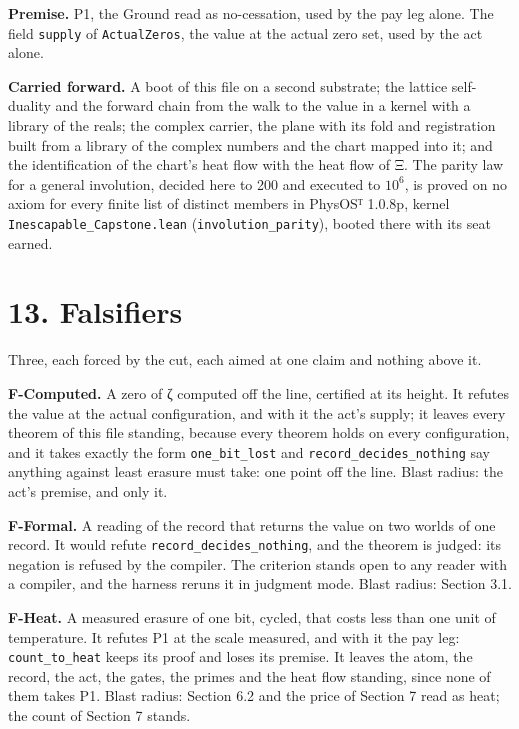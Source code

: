 \documentclass[10pt,twocolumn]{article}
\begin{document}
\textbf{Premise.} P1, the Ground read as no-cessation, used by the pay
leg alone. The field \texttt{supply} of \texttt{ActualZeros}, the value
at the actual zero set, used by the act alone.

\textbf{Carried forward.} A boot of this file on a second substrate; the
lattice self-duality and the forward chain from the walk to the value in
a kernel with a library of the reals; the complex carrier, the plane
with its fold and registration built from a library of the complex
numbers and the chart mapped into it; and the identification of the
chart's heat flow with the heat flow of Ξ. The parity law for a general
involution, decided here to 200 and executed to \(10^6\), is proved on
no axiom for every finite list of distinct members in PhysOSᵀ 1.0.8p,
kernel \texttt{Inescapable\_\allowbreak{}Capstone.lean}
(\texttt{involution\_\allowbreak{}parity}), booted there with its seat earned.

\hypertarget{falsifiers}{%
\section{13. Falsifiers}\label{falsifiers}}

Three, each forced by the cut, each aimed at one claim and nothing above
it.

\textbf{F-Computed.} A zero of ζ computed off the line, certified at its
height. It refutes the value at the actual configuration, and with it
the act's supply; it leaves every theorem of this file standing, because
every theorem holds on every configuration, and it takes exactly the
form \texttt{one\_\allowbreak{}bit\_\allowbreak{}lost} and \texttt{record\_\allowbreak{}decides\_\allowbreak{}nothing} say
anything against least erasure must take: one point off the line. Blast
radius: the act's premise, and only it.

\textbf{F-Formal.} A reading of the record that returns the value on two
worlds of one record. It would refute \texttt{record\_\allowbreak{}decides\_\allowbreak{}nothing},
and the theorem is judged: its negation is refused by the compiler. The
criterion stands open to any reader with a compiler, and the harness
reruns it in judgment mode. Blast radius: Section 3.1.

\textbf{F-Heat.} A measured erasure of one bit, cycled, that costs less
than one unit of temperature. It refutes P1 at the scale measured, and
with it the pay leg: \texttt{count\_\allowbreak{}to\_\allowbreak{}heat} keeps its proof and loses
its premise. It leaves the atom, the record, the act, the gates, the
primes and the heat flow standing, since none of them takes P1. Blast
radius: Section 6.2 and the price of Section 7 read as heat; the count
of Section 7 stands.
\end{document}
